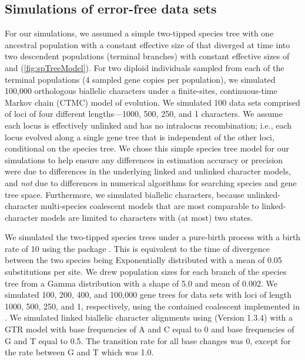 \subsection{Simulations of error-free data sets}
For our simulations, we assumed a simple two-tipped species tree with one 
ancestral population with a constant effective size of \rootpopsize that 
diverged at time \divtime into two descendent populations (terminal branches) 
with constant effective sizes of \tippopsize[1] and \tippopsize[2] (\cref{fig:spTreeModel}).
For two diploid individuals sampled from each of the terminal
populations (4 sampled gene copies per population),
we simulated 100,000 orthologous biallelic characters under a finite-sites,
continuous-time Markov chain (CTMC) model of evolution.
We simulated 100 data sets comprised of loci of four different lengths---1000,
500, 250, and 1 characters.
We assume each locus is effectively unlinked and has no intralocus
recombination; i.e., each locus evolved along a single gene tree that is
independent of the other loci, conditional on the species tree.
We chose this simple species tree model for our simulations to help ensure any
differences in estimation accuracy or precision were due to differences in the
underlying linked and unlinked character models,
and \emph{not} due to differences in numerical algorithms for searching species
and gene tree space.
Furthermore, we simulated biallelic characters, because unlinked-character
multi-species coalescent models
\citep{bryantInferringSpeciesTrees2012,oaksFullBayesianComparative2019}
that are most comparable to linked-character models
\citep{heledBayesianInferenceSpecies2010,ogilvieStarBEAST2BringsFaster2017}
are limited to characters with (at most) two states.

We simulated the two-tipped species trees under a pure-birth process
\citep{Yule1925} with a birth rate of 10 using the \python package \dendropy
\citep[Version 4.40, Commit eb69003;][]{sukumaranDendroPyPythonLibrary2010}.
This is equivalent to the time of divergence between the two species being
Exponentially distributed with a mean of 0.05 substitutions per site.
We drew population sizes for each branch of the species tree from a Gamma 
distribution with a shape of 5.0 and mean of 0.002.
We simulated 100, 200, 400, and 100,000 gene trees for data sets with loci of
length 1000, 500, 250, and 1, respectively, using the contained coalescent
implemented in \dendropy.
We simulated linked biallelic character alignments using
\seqgen (Version 1.3.4)
\citep{rambautSeqGenApplicationMonte1997}
with a GTR model with base frequencies of A and C equal to 0 and base 
frequencies of G and T equal to 0.5.
The transition rate for all base changes was 0, except for the rate between G
and T which was 1.0. 


